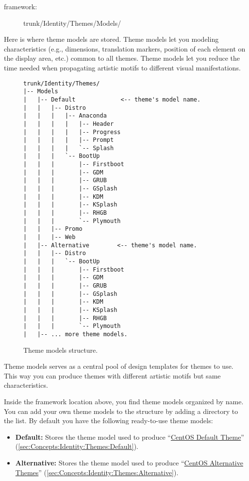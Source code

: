 \begin{description}
\item[framework:] trunk/Identity/Themes/Models/
\end{description}

\noindent Here is where theme models are stored.  Theme models let you
modeling characteristics (e.g., dimensions, translation markers,
position of each element on the display area, etc.) common to all
themes.  Theme models let you reduce the time needed when propagating
artistic motifs to different visual manifestations.

\begin{figure}[!hbp]
\hrulefill
\begin{verbatim}
trunk/Identity/Themes/
|-- Models
|   |-- Default             <-- theme's model name.
|   |   |-- Distro
|   |   |   |-- Anaconda
|   |   |   |   |-- Header
|   |   |   |   |-- Progress
|   |   |   |   |-- Prompt
|   |   |   |   `-- Splash
|   |   |   `-- BootUp
|   |   |       |-- Firstboot
|   |   |       |-- GDM
|   |   |       |-- GRUB
|   |   |       |-- GSplash
|   |   |       |-- KDM
|   |   |       |-- KSplash  
|   |   |       |-- RHGB
|   |   |       `-- Plymouth
|   |   |-- Promo
|   |   |-- Web
|   |-- Alternative        <-- theme's model name.
|   |   |-- Distro
|   |   |   `-- BootUp
|   |   |       |-- Firstboot
|   |   |       |-- GDM
|   |   |       |-- GRUB
|   |   |       |-- GSplash
|   |   |       |-- KDM
|   |   |       |-- KSplash  
|   |   |       |-- RHGB
|   |   |       `-- Plymouth
|   |-- ... more theme models.
\end{verbatim}
\hrulefill
\caption{Theme models structure.%
   \label{fig:Concepts:Identity:Themes:Models}}
\end{figure}

Theme models serves as a central pool of design templates for themes
to use. This way you can produce themes with different artistic motifs
but same characteristics.

Inside the framework location above, you find theme models organized
by name. You can add your own theme models to the structure by adding
a directory to the list. By default you have the following
ready-to-use theme models:

\begin{itemize}

\item \textbf{Default:} Stores the theme model used to produce
``\hyperlink{sec:Concepts:Identity:Themes:Default}{CentOS
Default Theme}''
(\autoref{sec:Concepts:Identity:Themes:Default}). 

\item \textbf{Alternative:} Stores the theme model used to produce
``\hyperlink{sec:Concepts:Identity:Themes:Alternative}{CentOS
Alternative Themes}''
(\autoref{sec:Concepts:Identity:Themes:Alternative}). 

\end{itemize}

